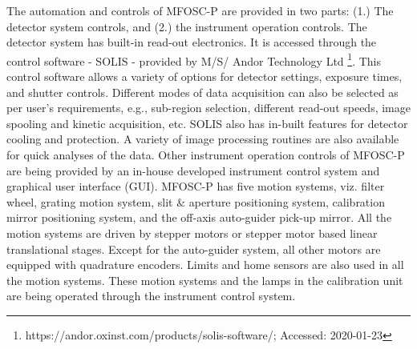 The automation and controls of MFOSC-P are provided in two parts: (1.) The detector system controls, and (2.) the instrument operation controls. The detector system has built-in read-out electronics. It is accessed through the control software - SOLIS - provided by M/S/ Andor Technology Ltd \footnote{https://andor.oxinst.com/products/solis-software/; Accessed: 2020-01-23}. This control software allows a variety of options for detector settings, exposure times, and shutter controls. Different modes of data acquisition can also be selected as per user's requirements, e.g., sub-region selection, different read-out speeds, image spooling and kinetic acquisition, etc. SOLIS also has in-built features for detector cooling and protection. A variety of image processing routines are also available for quick analyses of the data. Other instrument operation controls of MFOSC-P are being provided by an in-house developed instrument control system and graphical user interface (GUI). MFOSC-P has five motion systems, viz. filter wheel, grating motion system, slit $\&$ aperture positioning system, calibration mirror positioning system, and the off-axis auto-guider pick-up mirror. All the motion systems are driven by stepper motors or stepper motor based linear translational stages. Except for the auto-guider system, all other motors are equipped with quadrature encoders. Limits and home sensors are also used in all the motion systems. These motion systems and the lamps in the calibration unit are being operated through the instrument control system.  
\par 
